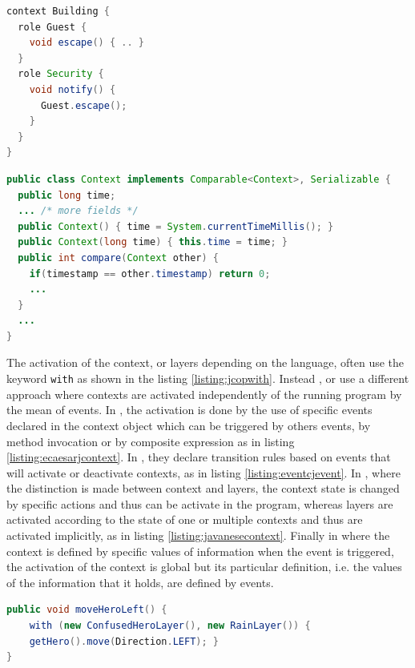 \documentclass[a4paper]{article}
\begin{document}
\begin{lstlisting}[float, language=Java, caption=NextEJ context declaration, label={listing:nextejcontext}]
context Building {
  role Guest {
    void escape() { .. }
  }
  role Security {
    void notify() {
      Guest.escape();
    }
  }
}
\end{lstlisting}

\begin{lstlisting}[float, language=Java, caption=EventJava context declaration, label={listing:eventjavacontext}]
public class Context implements Comparable<Context>, Serializable {
  public long time;
  ... /* more fields */
  public Context() { time = System.currentTimeMillis(); }
  public Context(long time) { this.time = time; }
  public int compare(Context other) {
    if(timestamp == other.timestamp) return 0;
    ...
  }
  ...
}
\end{lstlisting}

The activation of the context, or layers depending on the language, often use the keyword \lstinline|with| \cite{haupt_contextj:_2011} \cite{appeltauer_declarative_2013} \cite{kamina_towards_2009} \cite{wasty_contextlua:_2010} as shown in the listing \ref{listing:jcopwith}. Instead \cite{ghezzi_context_2010}, \cite{nunez_declarative_2009} or \cite{kamina_eventcj:_2011} use a different approach where contexts are activated independently of the running program by the mean of events. In \cite{nunez_declarative_2009}, the activation is done by the use of specific events declared in the context object which can be triggered by others events, by method invocation or by composite expression as in listing \ref{listing:ecaesarjcontext}. In \cite{kamina_eventcj:_2011}, they declare transition rules based on events that will activate or deactivate contexts, as in listing \ref{listing:eventcjevent}. In \cite{kamina_unified_2013}, where the distinction is made between context and layers, the context state is changed by specific actions and thus can be activate in the program, whereas layers are activated according to the state of one or multiple contexts and thus are activated implicitly, as in listing \ref{listing:javanesecontext}. Finally in \cite{jayaram_context-oriented_2009} where the context is defined by specific values of information when the event is triggered, the activation of the context is global but its particular definition, i.e. the values of the information that it holds, are defined by events.

 
\begin{lstlisting}[float, language=Java, caption=JCop layer activation, label={listing:jcopwith}]
public void moveHeroLeft() {
	with (new ConfusedHeroLayer(), new RainLayer()) {
    getHero().move(Direction.LEFT); }
}
\end{lstlisting}
\end{document}
